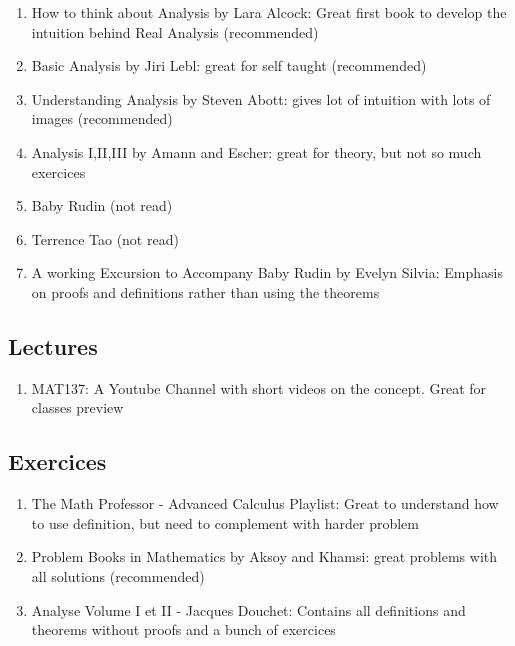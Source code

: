 \documentclass{article}
\begin{document}
\begin{enumerate}
    \item How to think about Analysis by Lara Alcock: Great first book
	to develop the intuition behind Real Analysis (recommended)
    \item Basic Analysis by Jiri Lebl: great for self taught (recommended)
    \item Understanding Analysis by Steven Abott: gives lot of intuition
	with lots of images (recommended)
    \item Analysis I,II,III by Amann and Escher: great for theory, but
	not so much exercices
    \item Baby Rudin (not read)
    \item Terrence Tao (not read)
    \item A working Excursion to Accompany Baby Rudin by Evelyn Silvia:
	Emphasis on proofs and definitions rather than using the theorems
\end{enumerate}

\subsection{Lectures}%
\label{sub:Lectures}

\begin{enumerate}
    \item MAT137: A Youtube Channel with short videos on the concept.
	Great for classes preview
\end{enumerate}

\subsection{Exercices}%
\label{sub:Exercices}

\begin{enumerate}
    \item The Math Professor - Advanced Calculus Playlist: Great to
	understand how to use definition, but need to complement with
	harder problem
    \item Problem Books in Mathematics by Aksoy and Khamsi: great problems
	with all solutions (recommended)
    \item Analyse Volume I et II - Jacques Douchet: Contains all definitions 	    and theorems without proofs and a bunch of exercices
\end{enumerate}
\end{document}
